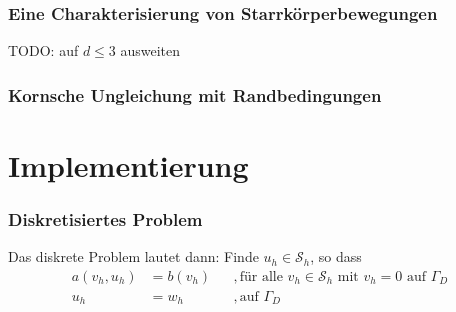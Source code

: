 \documentclass{scrartcl}
\newcommand{\cS}{\mathcal{S}}
\begin{document}
\subsubsection*{Eine Charakterisierung von Starrkörperbewegungen}

TODO: auf $d\leq 3$ ausweiten

\subsubsection*{Kornsche Ungleichung mit Randbedingungen}


\section{Implementierung}


\subsubsection*{Diskretisiertes Problem}
Das diskrete Problem lautet dann:
Finde $u_h\in\cS_h$, so dass
\begin{align*}
	a(v_h,u_h) &= b(v_h) &&,\text{für alle }v_h\in\cS_h\text{ mit }v_h=0\text{ auf }\Gamma_D \\
	u_h &= w_h &&,\text{auf }\Gamma_D
\end{align*}
\end{document}
